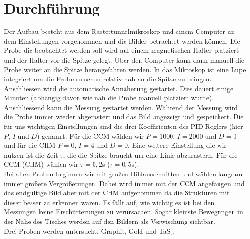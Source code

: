 \section{Durchführung}
Der Aufbau besteht aus dem Rastertunnelmikroskop und einem Computer an dem Einstellungen vorgenommen und die Bilder betrachtet werden können. Die Probe die beobachtet werden soll wird auf einem magnetischen Halter platziert und der Halter vor die Spitze gelegt. Über den Computer kann dann manuell die Probe weiter an die Spitze herangefahren werden. In das Mikroskop ist eine Lupe integriert um die Probe so schon relativ nah an die Spitze zu bringen. Anschliessen wird die automatische Annäherung gestartet. Dies dauert einige Minuten (abhängig davon wie nah die Probe manuell platziert wurde).\\
Anschliessend kann die Messung gestartet werden. Während der Messung wird die Probe immer wieder abgerastert und das Bild angezeigt und gespeichert. Die für uns wichtigen Einstellungen sind die drei Koeffizienten des PID-Reglers (hier $P$, $I$ und $D$) genannt. Für die CCM wählen wir $P=1000$, $I=2000$ und $D=0$ und für die CHM $P=0$, $I=4$ und $D=0$. Eine weitere Einstellung die wir nutzen ist die Zeit $\tau$, die die Spitze braucht um eine Linie abzurastern. Für die CCM (CHM) wählen wir $\tau=0,2$s ($\tau=0,5$s).\\
Bei allen Proben beginnen wir mit großen Bildausschnitten und wählen langsam immer größere Vergrößerungen. Dabei wird immer mit der CCM angefangen und das endgültige Bild aber mit der CHM aufgenommen da die Strukturen mit dieser besser zu erkennen waren. Es fällt auf, wie wichtig es ist bei den Messungen keine Erschütterungen zu verursachen. Sogar kleinste Bewegungen in der Nähe des Tisches werden auf den Bildern als Verwischung sichtbar.\\
Drei Proben werden untersucht, Graphit, Gold und TaS$_2$.  
